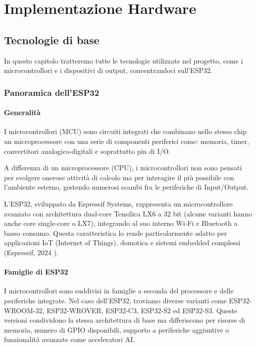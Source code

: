 \chapter{Implementazione Hardware}
\label{chap:implementazione_hardware}
\section{Tecnologie di base}

In questo capitolo tratteremo tutte le tecnologie utilizzate nel progetto, come i microcontrollori e i dispositivi di output,
 concentrandoci sull’ESP32.

\subsection{Panoramica dell’ESP32}

\subsubsection{Generalità}
I microcontrollori (MCU) sono circuiti integrati che combinano nello stesso chip un microprocessore con una serie di componenti periferici
 come: memoria, timer, convertitori analogico-digitali e soprattutto pin di I/O.

A differenza di un microprocessore (CPU), i microcontrollori non sono pensati per svolgere onerose attività di calcolo ma per interagire 
il più possibile con l’ambiente esterno, gestendo numerosi scambi fra le periferiche di Input/Output.

L’ESP32, sviluppato da Espressif Systems, rappresenta un microcontrollore avanzato con architettura dual-core Tensilica LX6 a 32 bit
 (alcune varianti hanno anche core single-core o LX7), integrando al suo interno Wi-Fi e Bluetooth a basso consumo. Questa caratteristica
  lo rende particolarmente adatto per applicazioni IoT (Internet of Things), domotica e sistemi embedded complessi (Espressif, 2024 \cite{Espressif2024}).

\subsubsection{Famiglie di ESP32}
I microcontrollori sono suddivisi in famiglie a seconda del processore e delle periferiche integrate. Nel caso dell’ESP32,
 troviamo diverse varianti come ESP32-WROOM-32, ESP32-WROVER, ESP32-C3, ESP32-S2 ed ESP32-S3.  
Queste versioni condividono la stessa architettura di base ma differiscono per risorse di memoria, numero di GPIO disponibili,
 supporto a periferiche aggiuntive o funzionalità avanzate come acceleratori AI.  

